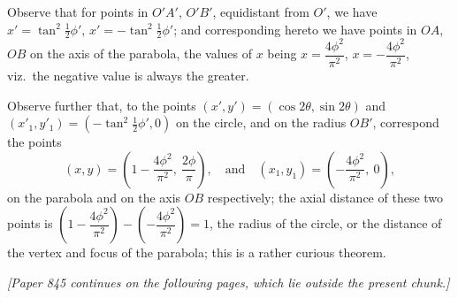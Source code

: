 \documentclass[11pt]{article}
\begin{document}
\medskip

Observe that for points in $O'A'$, $O'B'$, equidistant from $O'$, we have $x' = \tan^{2}\tfrac{1}{2}\phi'$, $x' = -\tan^{2}\tfrac{1}{2}\phi'$; and corresponding hereto we have points in $OA$, $OB$ on the axis of the parabola, the values of $x$ being $x = \dfrac{4\phi^{2}}{\pi^{2}}$, $x = -\dfrac{4\phi^{2}}{\pi^{2}}$, viz.\ the negative value is always the greater.

\medskip

Observe further that, to the points $(x', y') = (\cos 2\theta, \sin 2\theta)$ and $(x'_{1}, y'_{1}) = (-\tan^{2}\tfrac{1}{2}\phi', 0)$ on the circle, and on the radius $OB'$, correspond the points
\[
(x, y) = \left(1 - \frac{4\phi^{2}}{\pi^{2}},\ \frac{2\phi}{\pi}\right),\quad\text{and}\quad (x_{1}, y_{1}) = \left(-\frac{4\phi^{2}}{\pi^{2}},\ 0\right),
\]
on the parabola and on the axis $OB$ respectively; the axial distance of these two points is $\left(1 - \dfrac{4\phi^{2}}{\pi^{2}}\right) - \left(-\dfrac{4\phi^{2}}{\pi^{2}}\right) = 1$, the radius of the circle, or the distance of the vertex and focus of the parabola; this is a rather curious theorem.

\medskip

\noindent\textit{[Paper 845 continues on the following pages, which lie outside the present chunk.]}
\end{document}
